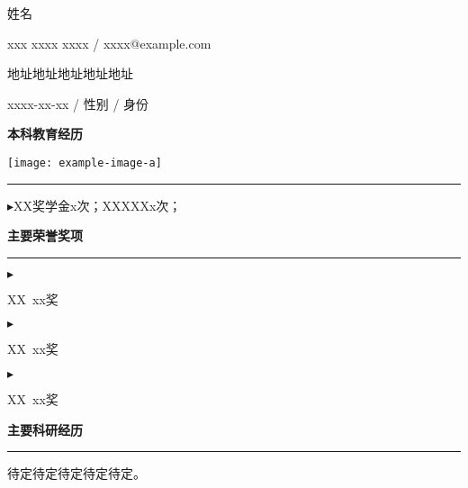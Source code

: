 \documentclass{resume}
\begin{document}
\begin{minipage}{0.51 \textwidth} 
	{\Large\heiti 姓名}

    xxx xxxx xxxx / xxxx@example.com

    地址地址地址地址地址

    xxxx-xx-xx / 性别 / 身份

    \bigskip

    {\bf\kaiti\large 本科教育经历}

\end{minipage}
\hspace{\fill}
\begin{minipage}{0.16\textwidth}
    \texttt{[image: example-image-a]}
\end{minipage}



\smallskip
\hrule
\medskip




$\blacktriangleright$XX奖学金x次；XXXXXx次；

\bigskip

{\bf\kaiti\large 主要荣誉奖项}

\smallskip
\hrule
\medskip

$\blacktriangleright$

XX\ xx奖

$\blacktriangleright$

XX\ xx奖

$\blacktriangleright$

XX\ xx奖

\bigskip

{\bf\kaiti\large 主要科研经历}

\smallskip
\hrule
\medskip


\hspace*{2em}待定待定待定待定待定。
\end{document}
